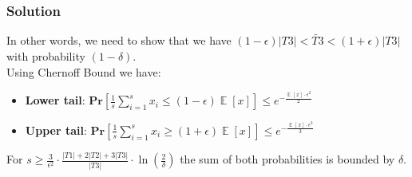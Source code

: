\documentclass[11pt]{article}
\begin{document}
\subsubsection*{Solution}
In other words, we need to show that we have $(1 - \epsilon)|T3| < \tilde{T3} < (1 + \epsilon)|T3|$ with probability $(1 - \delta)$. \\
Using Chernoff Bound we have: \\
\begin{itemize}
	\item \textbf{Lower tail}: $\mathbf{Pr}[\frac{1}{s}\sum\limits_{i = 1}^s x_i \le (1 - \epsilon)\mathop{\mathbb{E}}[x]] \le e^{-\frac{\mathop{\mathbb{E}}[x] \cdot \epsilon^2}{2}}$
	\item \textbf{Upper tail}: $\mathbf{Pr}[\frac{1}{s}\sum\limits_{i = 1}^s x_i \ge (1 + \epsilon)\mathop{\mathbb{E}}[x]] \le e^{-\frac{\mathop{\mathbb{E}}[x] \cdot \epsilon^2}{3}}$
\end{itemize}
For $s \ge \frac{3}{\epsilon^2} \cdot \frac{|T1| + 2|T2| + 3|T3|}{|T3|} \cdot \ln(\frac{2}{\delta})$ the sum of both probabilities is bounded by $\delta$.
\end{document}
